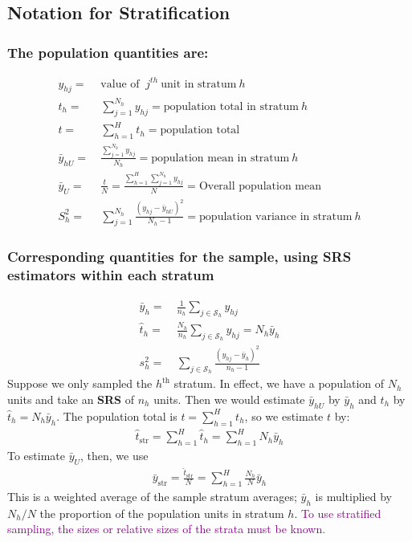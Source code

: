 \documentclass[a4paper,twoside,11pt]{article}
\begin{document}
\subsection{Notation for Stratification}
\subsubsection{The population quantities are:}
\begin{equation*}
\begin{aligned}
y_{hj} =& \ \text{value of } \ j^{th} \ \text{unit in stratum} \ h  \\
t_h =& \ \sum^{N_h}_{j=1} y_{hj} = \text{population total in stratum} \ h \\
t =& \ \sum^H_{h=1} t_h = \text{population total} \\
\bar{y}_{hU} =& \ \frac{\sum^{N_h}_{j=1}y_{hj}}{N_h} = \text{population mean in stratum} \ h \\
\bar{y}_U =& \ \frac{t}{N} = \frac{\sum^H_{h=1}\sum^{N_h}_{j=1}y_{hj}}{N}=\text{Overall population mean} \\
S_h^2 =& \ \sum^{N_h}_{j=1} \frac{(y_{hj}-\bar{y}_{hU})^2}{N_h -1} = \text{population variance in stratum} \ h
\end{aligned}
\end{equation*}
\subsubsection{Corresponding quantities for the sample, using \textbf{SRS} estimators within each stratum}
\begin{equation*}
\begin{aligned}
\bar{y}_h =& \ \frac{1}{n_h} \sum_{j \in \mathcal{S}_h} y_{hj} \\
\hat{t}_h =& \ \frac{N_h}{n_h} \sum_{j \in \mathcal{S}_h} y_{hj} = N_h \bar{y}_h\\
s_h^2 =& \ \sum_{j \in \mathcal{S}_h} \frac{(y_{hj}- \bar{y}_h)^2}{n_h -1}
\end{aligned}
\end{equation*}
Suppose we only sampled the $h^{\text{th}}$ stratum. In effect, we have a population of $N_h$ units and take an \textbf{SRS} of $n_h$ units. Then we would estimate $\bar{y}_{hU}$ by $\bar{y}_h$ and $t_h$ by $\hat{t}_h = N_h \bar{y}_h$. The population total is $t= \sum^H_{h=1} t_h$, so we estimate $t$ by:
\begin{equation*}
\begin{aligned}
\hat{t}_{\text{str}} = \sum^H_{h=1} \hat{t}_h = \sum^H_{h=1} N_h \bar{y}_h
\end{aligned}
\end{equation*}
To estimate $\bar{y}_U$, then, we use
\begin{equation*}
\begin{aligned}
\bar{y}_{\text{str}} = \frac{\hat{t}_{\text{str}}}{N} = \sum^H_{h=1} \frac{N_h}{N} \bar{y}_h
\end{aligned}
\end{equation*}
This is a weighted average of the sample stratum averages; $\bar{y}_h$ is multiplied by $N_h/N$ the proportion of the population units in stratum $h$. \textcolor{Purple}{To use stratified sampling, the sizes or relative sizes of the strata must be known.}
\end{document}
